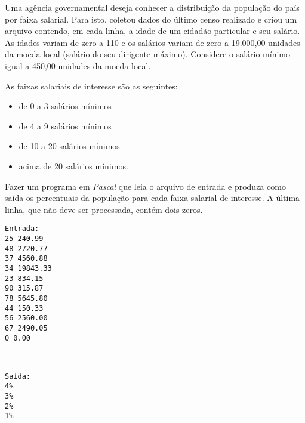 \item
Uma agência governamental deseja conhecer a distribuição da população do
país por faixa salarial. Para isto, coletou dados do
último censo realizado e criou um arquivo contendo, em cada linha, a
idade de um cidadão particular e seu salário. As idades variam de zero a
110 e os salários variam de zero a 19.000,00 unidades da moeda local
(salário do seu dirigente máximo). Considere o salário mínimo igual a 450,00 unidades da moeda local.

As faixas salariais de interesse são as seguintes:
\begin{itemize}
\item de 0 a 3 salários mínimos
\item de 4 a 9 salários mínimos
\item de 10 a 20 salários mínimos
\item acima de 20 salários mínimos.
\end{itemize}
Fazer um programa em \emph{Pascal} que leia o arquivo de entrada e produza como
saída os percentuais da população para cada faixa salarial
de interesse. A última linha, que não deve ser processada, contém dois zeros.

\begin{minipage}{5cm}
\begin{verbatim}
Entrada:
25 240.99
48 2720.77
37 4560.88
34 19843.33
23 834.15
90 315.87
78 5645.80
44 150.33
56 2560.00
67 2490.05
0 0.00  
\end{verbatim}
\end{minipage} \
\begin{minipage}{5cm}
\begin{verbatim}
Saída:
4%
3%
2%
1%
\end{verbatim}
\end{minipage}